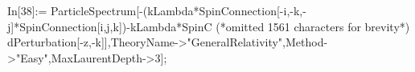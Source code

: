 In[38]:= ParticleSpectrum[-(kLambda*SpinConnection[-i,-k,-j]*SpinConnection[i,j,k])-kLambda*SpinC (*omitted 1561 characters for brevity*) dPerturbation[-z,-k]],TheoryName->"GeneralRelativity",Method->"Easy",MaxLaurentDepth->3];